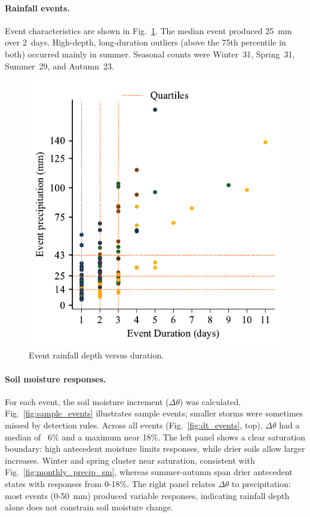\documentclass[8pt, twocolumn]{extarticle}
\begin{document}
\paragraph{Rainfall events.}
Event characteristics are shown in Fig.~\ref{fig:rain_events}. The median event produced 25~mm over 2~days. High-depth, long-duration outliers (above the 75th percentile in both) occurred mainly in summer. Seasonal counts were Winter~31, Spring~31, Summer~29, and Autumn~23.

\begin{figure}[!htbp]
    \centering
    \includegraphics[width=0.75\columnwidth]{rain events}
    \caption{Event rainfall depth versus duration.}
    \label{fig:rain_events}
\end{figure}

\paragraph{Soil moisture responses.}

For each event, the soil moisture increment ($\Delta \theta$) was calculated. Fig.~\ref{fig:sample_events} illustrates sample events; smaller storms were sometimes missed by detection rules. Across all events (Fig.~\ref{fig:dt_events}, top), $\Delta \theta$ had a median of ~6\% and a maximum near 18\%. The left panel shows a clear saturation boundary: high antecedent moisture limits responses, while drier soils allow larger increases. Winter and spring cluster near saturation, consistent with Fig.~\ref{fig:monthly_precip_sm}, whereas summer-autumn span drier antecedent states with responses from 0-18\%. The right panel relates $\Delta \theta$ to precipitation: most events (0-50~mm) produced variable responses, indicating rainfall depth alone does not constrain soil moisture change.
\end{document}
